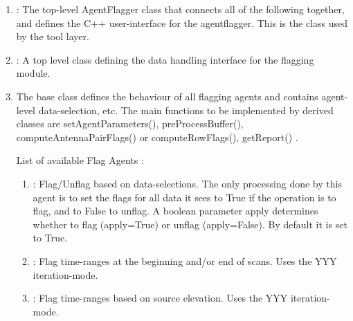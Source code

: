 \begin{enumerate}
\item
:
The top-level AgentFlagger class that connects all of the following together, and defines the C++ user-interface 
for the agentflagger.  
This is the class used by the tool layer.

\item {} : 
A top level class defining the data handling interface for the flagging module. 

\item The   
base class defines the behaviour of all flagging agents
and contains agent-level data-selection, etc.  The main functions to be implemented by derived classes are
setAgentParameters(), preProcessBuffer(), computeAntennaPairFlags() or computeRowFlags(), getReport() . 

List of available Flag Agents : 
\begin{enumerate}
\item {} :  
Flag/Unflag based on data-selections.  
The only processing done by this agent is to set the flags for all data it sees to 
True if the operation is to flag, and to False to unflag. A boolean parameter
apply determines whether to flag (apply=True) or unflag (apply=False). By
default it is set to True.

\item {} :  
Flag time-ranges at the beginning and/or end of scans. 
Uses the YYY iteration-mode. 

\item {} : 
Flag time-ranges based on source elevation. 
Uses the YYY iteration-mode.


\end{enumerate}
\end{enumerate}
